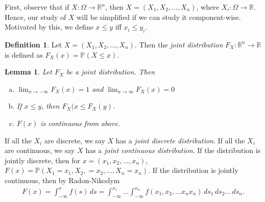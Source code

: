 \documentclass[12pt]{article}
\newcommand{\rr}{\mathbb{R}}
\newcommand{\prob}{\mathbb{P}}
\theoremstyle{plain}
\newtheorem{lemma}[theorem]{Lemma}
\theoremstyle{definition}
\newtheorem*{definition}{Definition}
\theoremstyle{remark}
\numberwithin{equation}{section}  %
\begin{document}
First, observe that if ${X}: \Omega \to \rr^n$, then $X = (X_1, X_2,
\ldots, X_n)$, where $X_i: \Omega \to \rr$. Hence, our study of $X$ will be
simplified if we can study it component-wise. Motivated by this, we define
$x \le y$ iff $x_i \le y_i$. 
\begin{definition}
Let ${X} = (X_1, X_2, \ldots, X_n)$. Then the \emph{joint distribution}
$F_X: \rr^n \to \rr$
is defined as $F_X(x) = \prob({X} \le x)$.
\begin{lemma}
Let $F_X$ be a joint distribution. Then
\begin{enumerate}[a)]
\item
$\lim_{x \to -\infty} F_X(x) = 1$ and $\lim_{x \to \infty}
F_X(x) = 0$
\item
If $x \le y$, then $F_X(x \le F_X(y)$.
\item
$F(x)$ is continuous from above.
\end{enumerate}
\end{lemma}
If all the $X_i$ are discrete, we say $X$ has a \emph{joint discrete
distribution}. If all the $X_i$ are continuous, we say $X$ has a 
\emph{joint continuous distribution}. If the distribution is jointly discrete,
then for $x = (x_1, x_2, \ldots, x_n)$,
 $F(x) = \prob(X_1 = x_1, X_2, = x_2,
\ldots, X_n = x_n)$. If the distribution is jointly continuous, then by
Radon-Nikodym
\begin{align*}
F(x) = \int_{-\infty}^x f(s) \, ds = \int_{-\infty}^{x_1} \ldots
\int_{-\infty}^{x_n} f(x_1, x_2, \ldots x_nx_n) \, ds_1 \, ds_2 \ldots \, ds_n.
\end{align*}


\end{definition}
\end{document}
